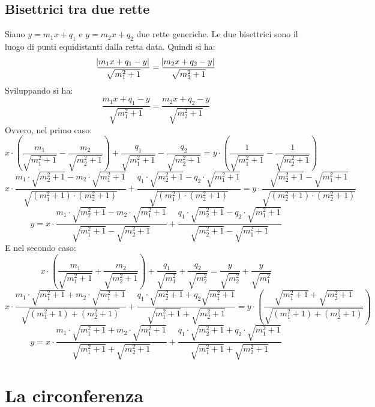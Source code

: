 \documentclass[12pt]{book}
\begin{document}
		\section{Bisettrici tra due rette}
			Siano $y=m_1x+q_1$ e $y=m_2x+q_2$ due rette generiche. Le due bisettrici sono il luogo di punti equidistanti dalla retta data. Quindi si ha:
			\[\frac{\abs{m_1x+q_1-y}}{\sqrt{m_1^2+1}}=
			\frac{\abs{m_2x+q_2-y}}{\sqrt{m_2^2+1}}\]
			Sviluppando si ha:
			\[\frac{m_1x+q_1-y}{\sqrt{m_1^2+1}}=
			\frac{m_2x+q_2-y}{\sqrt{m_2^2+1}}\]
			Ovvero, nel primo caso:
			\[x\cdot\left(\frac{m_1}{\sqrt{m_1^2+1}}
			-\frac{m_2}{\sqrt{m_2^2+1}}\right)
			+\frac{q_1}{\sqrt{m_1^2+1}}
			-\frac{q_2}{\sqrt{m_2^2+1}}
			=y\cdot\left(\frac{1}{\sqrt{m_1^2+1}}
			-\frac{1}{\sqrt{m_2^2+1}}
			\right)\]
			\[x\cdot\frac{m_1\cdot\sqrt{m_2^2+1}-m_2\cdot\sqrt{m_1^2+1}}{\sqrt{\left(m_1^2+1\right)\cdot\left(m_2^2+1\right)}}
			+\frac{q_1\cdot\sqrt{m_2^2+1}-q_2\cdot\sqrt{m_1^2+1}}
			{\sqrt{\left(m_1^2\right)\cdot\left(m_2^2+1\right)}}=
			y\cdot\frac{\sqrt{m_2^2+1}-\sqrt{m_1^2+1}}
			{\sqrt{\left(m_2^2+1\right)\cdot\left(m_2^2+1\right)}}\]
			\[y=x\cdot\frac{m_1\cdot\sqrt{m_2^2+1}-m_2\cdot\sqrt{m_1^2+1}}
			{\sqrt{m_1^2+1}-\sqrt{m_2^2+1}}
			+\frac{q_1\cdot\sqrt{m_2^2+1}-q_2\cdot\sqrt{m_1^2+1}}
			{\sqrt{m_2^2+1}-\sqrt{m_1^2+1}}\]
			E nel secondo caso:
			\[x\cdot\left(\frac{m_1}{\sqrt{m_1^2+1}}
			+\frac{m_2}{\sqrt{m_2^2+1}}\right)
			+\frac{q_1}{\sqrt{m_1^2}}
			+\frac{q_2}{\sqrt{m_2^2}}
			=\frac{y}{\sqrt{m_2^2}}
			+\frac{y}{\sqrt{m_1^2}}
			\]	
			\[x\cdot\frac{m_1\cdot\sqrt{m_1^2+1}+m_2\cdot\sqrt{m_1^2+1}}
			{\sqrt{\left(m_1^2+1\right)+\left(m_2^2+1\right)}}
			+\frac{q_1\cdot\sqrt{m_2^2+1}+q_2\sqrt{m_1^2+1}}
			{\sqrt{m_1^2+1}+\sqrt{m_2^2+1}}
			=y\cdot\left(\frac{\sqrt{m_1^2+1}+\sqrt{m_2^2+1}}
			{\sqrt{\left(m_1^2+1\right)+\left(m_2^2+1\right)}}\right)
			\]
			\[y=x\cdot\frac{m_1\cdot\sqrt{m_1^2+1}+m_2\cdot\sqrt{m_1^2+1}}
			{\sqrt{m_1^2+1}+\sqrt{m_2^2+1}}
			+\frac{q_1\cdot\sqrt{m_2^2+1}+q_2\cdot\sqrt{m_1^2+1}}
			{\sqrt{m_1^2+1}+\sqrt{m_2^2+1}}
			\]
			
	\chapter{La circonferenza}
\end{document}
